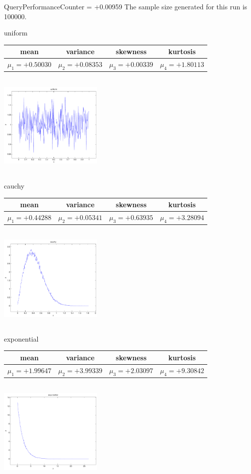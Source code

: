 \documentclass[9pt]{article}
\theoremstyle{plain}
\theoremstyle{definition}
\theoremstyle{remark}
\numberwithin{equation}{section}
\begin{document}
QueryPerformanceCounter  =  +0.00959
The sample size generated for this run is 100000.

\newpage
uniform \begin{tabular}{|c|c|c|c|}  mean & variance & skewness & kurtosis \\  \hline
$\mu_1 = +0.50030$ & $\mu_2 = +0.08353$ & $\mu_3 = +0.00339$ & $\mu_4 =+1.80113$ \\
\end{tabular}

\includegraphics[width=5cm,height=5cm]{uniform.pdf}

cauchy \begin{tabular}{|c|c|c|c|}  mean & variance & skewness & kurtosis \\  \hline
$\mu_1 = +0.44288$ & $\mu_2 = +0.05341$ & $\mu_3 = +0.63935$ & $\mu_4 =+3.28094$ \\
\end{tabular}

\includegraphics[width=5cm,height=5cm]{cauchy.pdf}

exponential \begin{tabular}{|c|c|c|c|}  mean & variance & skewness & kurtosis \\  \hline
$\mu_1 = +1.99647$ & $\mu_2 = +3.99339$ & $\mu_3 = +2.03097$ & $\mu_4 =+9.30842$ \\
\end{tabular}

\includegraphics[width=5cm,height=5cm]{exponential.pdf}
\end{document}
